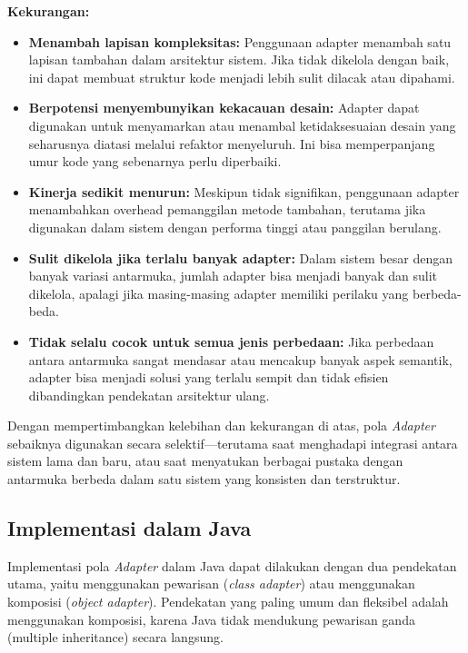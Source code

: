 \textbf{Kekurangan:}
\begin{itemize}
	\item \textbf{Menambah lapisan kompleksitas:} Penggunaan adapter menambah satu lapisan tambahan dalam arsitektur sistem. Jika tidak dikelola dengan baik, ini dapat membuat struktur kode menjadi lebih sulit dilacak atau dipahami.
	
	\item \textbf{Berpotensi menyembunyikan kekacauan desain:} Adapter dapat digunakan untuk menyamarkan atau menambal ketidaksesuaian desain yang seharusnya diatasi melalui refaktor menyeluruh. Ini bisa memperpanjang umur kode yang sebenarnya perlu diperbaiki.
	
	\item \textbf{Kinerja sedikit menurun:} Meskipun tidak signifikan, penggunaan adapter menambahkan overhead pemanggilan metode tambahan, terutama jika digunakan dalam sistem dengan performa tinggi atau panggilan berulang.
	
	\item \textbf{Sulit dikelola jika terlalu banyak adapter:} Dalam sistem besar dengan banyak variasi antarmuka, jumlah adapter bisa menjadi banyak dan sulit dikelola, apalagi jika masing-masing adapter memiliki perilaku yang berbeda-beda.
	
	\item \textbf{Tidak selalu cocok untuk semua jenis perbedaan:} Jika perbedaan antara antarmuka sangat mendasar atau mencakup banyak aspek semantik, adapter bisa menjadi solusi yang terlalu sempit dan tidak efisien dibandingkan pendekatan arsitektur ulang.
\end{itemize}

Dengan mempertimbangkan kelebihan dan kekurangan di atas, pola \textit{Adapter} sebaiknya digunakan secara selektif—terutama saat menghadapi integrasi antara sistem lama dan baru, atau saat menyatukan berbagai pustaka dengan antarmuka berbeda dalam satu sistem yang konsisten dan terstruktur.

\subsection{Implementasi dalam Java}

Implementasi pola \textit{Adapter} dalam Java dapat dilakukan dengan dua pendekatan utama, yaitu menggunakan pewarisan (\textit{class adapter}) atau menggunakan komposisi (\textit{object adapter}). Pendekatan yang paling umum dan fleksibel adalah menggunakan komposisi, karena Java tidak mendukung pewarisan ganda (multiple inheritance) secara langsung.

